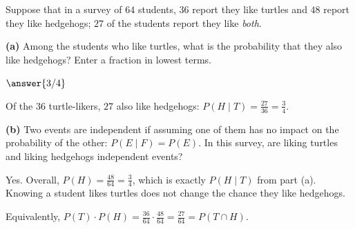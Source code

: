 \documentclass[12pt]{ximera}
\begin{document}
\begin{problem}
Suppose that in a survey of $64$ students, $36$ report they like turtles and $48$ report
they like hedgehogs; $27$ of the students report they like \emph{both}.

\begin{prompt}
\textbf{(a)} Among the students who like turtles, what is the probability that they also
like hedgehogs? Enter a fraction in lowest terms.

$\answer{3/4}$

\begin{feedback}
Of the $36$ turtle-likers, $27$ also like hedgehogs: $P(H\mid T)=\frac{27}{36}=\frac34$.
\end{feedback}
\end{prompt}

\begin{prompt}
\textbf{(b)} Two events are independent if assuming one of them has no impact on the
probability of the other: $P(E\mid F)=P(E)$. In this survey, are liking turtles and
liking hedgehogs independent events?

\begin{multipleChoice}
\end{multipleChoice}

\begin{feedback}
Yes. Overall, $P(H)=\frac{48}{64}=\frac34$, which is exactly $P(H\mid T)$ from part (a).
Knowing a student likes turtles does not change the chance they like hedgehogs.

Equivalently, $P(T)\cdot P(H)=\frac{36}{64}\cdot\frac{48}{64}=\frac{27}{64}=P(T\cap H)$.
\end{feedback}
\end{prompt}
\end{problem}
\end{document}
